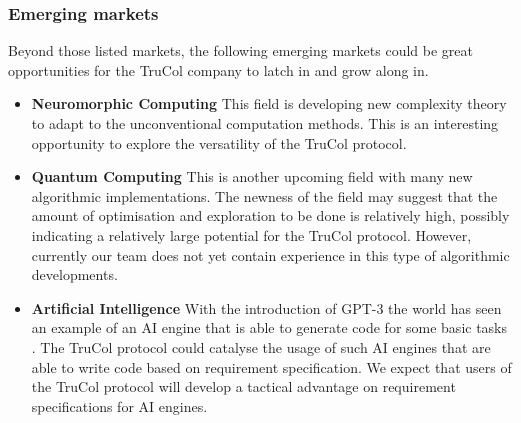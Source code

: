 \subsubsection{Emerging markets}\label{subsubsec:emerging_markets}
Beyond those listed markets, the following emerging markets could be great opportunities for the TruCol company to latch in and grow along in.
\begin{itemize}
	\item \textbf{Neuromorphic Computing} This field is developing new complexity theory to adapt to the unconventional computation methods. This is an interesting opportunity to explore the versatility of the TruCol protocol.
	\item \textbf{Quantum Computing} This is another upcoming field with many new algorithmic implementations. The newness of the field may suggest that the amount of optimisation and exploration to be done is relatively high, possibly indicating a relatively large potential for the TruCol protocol. However, currently our team does not yet contain experience in this type of algorithmic developments.
	\item \textbf{Artificial Intelligence} With the introduction of GPT-3 the world has seen an example of an AI engine that is able to generate code for some basic tasks \cite{todo}. The TruCol protocol could catalyse the usage of such AI engines that are able to write code based on requirement specification. We expect that users of the TruCol protocol will develop a tactical advantage on requirement specifications for AI engines.
\end{itemize}


